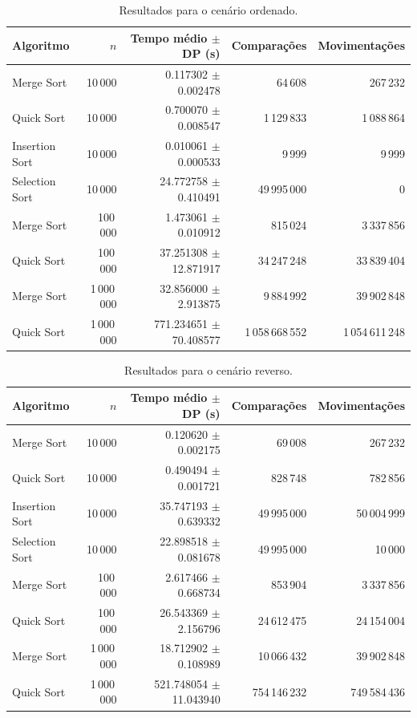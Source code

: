 \begin{table}[H]
\centering
\caption{Resultados para o cenário ordenado.}
\label{tab:resultados-ordenado}
\footnotesize
\setlength{\tabcolsep}{3pt}
\begin{tabular}{lrrrr}
\toprule
Algoritmo & $n$ & Tempo médio $\pm$ DP (s) & Comparações & Movimentações \\
\midrule
Merge Sort & 10\,000 & 0.117302 $\pm$ 0.002478 & 64\,608 & 267\,232 \\
Quick Sort & 10\,000 & 0.700070 $\pm$ 0.008547 & 1\,129\,833 & 1\,088\,864 \\
Insertion Sort & 10\,000 & 0.010061 $\pm$ 0.000533 & 9\,999 & 9\,999 \\
Selection Sort & 10\,000 & 24.772758 $\pm$ 0.410491 & 49\,995\,000 & 0 \\
Merge Sort & 100\,000 & 1.473061 $\pm$ 0.010912 & 815\,024 & 3\,337\,856 \\
Quick Sort & 100\,000 & 37.251308 $\pm$ 12.871917 & 34\,247\,248 & 33\,839\,404 \\
Merge Sort & 1\,000\,000 & 32.856000 $\pm$ 2.913875 & 9\,884\,992 & 39\,902\,848 \\
Quick Sort & 1\,000\,000 & 771.234651 $\pm$ 70.408577 & 1\,058\,668\,552 & 1\,054\,611\,248 \\
\bottomrule
\end{tabular}
\end{table}

\begin{table}[H]
\centering
\caption{Resultados para o cenário reverso.}
\label{tab:resultados-reverso}
\footnotesize
\setlength{\tabcolsep}{3pt}
\begin{tabular}{lrrrr}
\toprule
Algoritmo & $n$ & Tempo médio $\pm$ DP (s) & Comparações & Movimentações \\
\midrule
Merge Sort & 10\,000 & 0.120620 $\pm$ 0.002175 & 69\,008 & 267\,232 \\
Quick Sort & 10\,000 & 0.490494 $\pm$ 0.001721 & 828\,748 & 782\,856 \\
Insertion Sort & 10\,000 & 35.747193 $\pm$ 0.639332 & 49\,995\,000 & 50\,004\,999 \\
Selection Sort & 10\,000 & 22.898518 $\pm$ 0.081678 & 49\,995\,000 & 10\,000 \\
Merge Sort & 100\,000 & 2.617466 $\pm$ 0.668734 & 853\,904 & 3\,337\,856 \\
Quick Sort & 100\,000 & 26.543369 $\pm$ 2.156796 & 24\,612\,475 & 24\,154\,004 \\
Merge Sort & 1\,000\,000 & 18.712902 $\pm$ 0.108989 & 10\,066\,432 & 39\,902\,848 \\
Quick Sort & 1\,000\,000 & 521.748054 $\pm$ 11.043940 & 754\,146\,232 & 749\,584\,436 \\
\bottomrule
\end{tabular}
\end{table}

